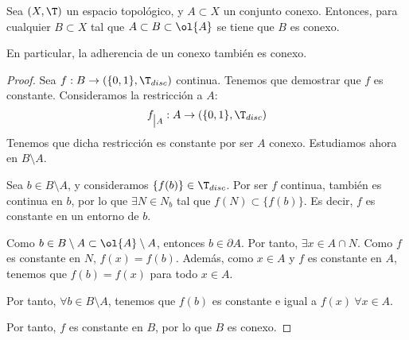 \begin{teo}\label{teo:AdherenciaConexo}
    Sea $(X,\T)$ un espacio topológico, y $A\subset X$ un conjunto conexo. Entonces, para cualquier $B\subset X$ tal que $A\subset B\subset \ol{A}$ se tiene que $B$ es conexo.

    En particular, la adherencia de un conexo también es conexo.
\end{teo}
\begin{proof}
    Sea $f:B\to (\{0,1\},\T_{disc})$ continua. Tenemos que demostrar que $f$ es constante. Consideramos la restricción a $A$:
    \begin{equation*}
        f_{\big| A}: A \to (\{0,1\},\T_{disc})
    \end{equation*}
    Tenemos que dicha restricción es constante por ser $A$ conexo.
    Estudiamos ahora en $B\setminus A$.

    Sea $b\in B\setminus A$, y consideramos $\{f(b)\}\in \T_{disc}$. Por ser $f$ continua, también es continua en $b$,
    por lo que $\exists N\in N_b$ tal que $f(N)\subset \{f(b)\}$. Es decir, $f$ es constante en un entorno de $b$.

    Como $b\in B\setminus A \subset \ol{A}\setminus A$, entonces $b\in \partial A$. Por tanto, $\exists x\in A\cap N$. Como $f$ es constante en $N$, $f(x)=f(b)$. Además, como $x\in A$ y $f$ es constante en $A$, tenemos que $f(b)=f(x)$ para todo $x\in A$.

    Por tanto, $\forall b\in B\setminus A$, tenemos que $f(b)$ es constante e igual a $f(x)~\forall x\in A$.

    Por tanto, $f$ es constante en $B$, por lo que $B$ es conexo.
\end{proof}



